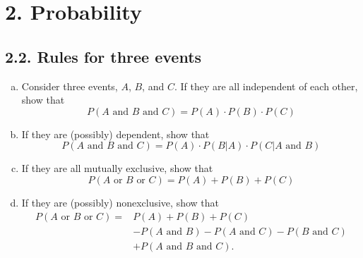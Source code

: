 \chapter*{2. Probability}

\section*{2.2. Rules for three events}
\begin{enumerate}[(a)]
    \item Consider three events, $A$, $B$, and $C$. 
        If they are all independent of each other,
        show that
        \begin{equation*}\tag{2.76}
            P(A \text{ and } B \text{ and } C) = P(A) \cdot P(B) \cdot P(C) 
        \end{equation*}

    \item If they are (possibly) dependent, show that 
        \begin{equation*}\tag{2.77}
            P(A \text{ and } B \text{ and } C) = P(A) \cdot P(B | A) \cdot P(C | A \text{ and } B) 
        \end{equation*}

    \item If they are all mutually exclusive, show that
        \begin{equation*}\tag{2.78}
            P(A \text{ or } B \text{ or } C) = P(A) + P(B) + P(C)
        \end{equation*}

    \item If they are (possibly) nonexclusive, show that
        \begin{align*}\tag{2.79}
            P(A \text{ or } B \text{ or } C) =& P(A) + P(B) + P(C) \\
                                          &- P(A \text{ and } B) - P(A \text{ and } C) - P(B \text{ and } C) \\
                                          &+ P(A \text{ and } B \text{ and } C)
        .\end{align*}
\end{enumerate}

